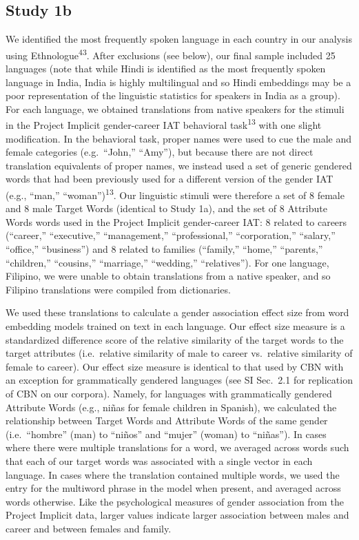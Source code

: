 \documentclass[9pt,twocolumn]{pnas-new}
\begin{document}
\subsection*{Study 1b}

We identified the most frequently spoken language in each country in our
analysis using Ethnologue\textsuperscript{43}. After exclusions
(see below), our final sample included 25
languages (note that while Hindi is identified as the most frequently spoken language in India, India is highly multilingual and so Hindi embeddings may be a poor representation of  the linguistic statistics for speakers in India as a group).
For each language, we obtained translations from native speakers for the
stimuli in the Project Implicit gender-career IAT behavioral task\textsuperscript{13} with one slight modification. In the behavioral task,
proper names were used to cue the male and female categories
(e.g.~\enquote{John,} \enquote{Amy}), but because there are not direct
translation equivalents of proper names, we instead used a set of
generic gendered words that had been previously used for a different
version of the gender IAT (e.g., ``man,'' ``woman'')\textsuperscript{13}. Our linguistic stimuli were therefore a set of 8 female and 8
male Target Words (identical to Study 1a), and the set of 8 Attribute
Words words used in the Project Implicit gender-career IAT: 8 related to
careers (\enquote{career,} \enquote{executive,} \enquote{management,}
\enquote{professional,} \enquote{corporation,} \enquote{salary,}
\enquote{office,} \enquote{business}) and 8 related to families
(\enquote{family,} \enquote{home,} \enquote{parents,}
\enquote{children,} \enquote{cousins,} \enquote{marriage,}
\enquote{wedding,} \enquote{relatives}). For one language, Filipino, we
were unable to obtain translations from a native speaker, and so
Filipino translations were compiled from dictionaries.

We used these translations to calculate a gender association effect size from
word embedding models trained on text in each language. Our effect size
measure is a standardized difference score of the relative similarity of
the target words to the target attributes (i.e.~relative similarity of
male to career vs.~relative similarity of female to career). Our effect
size measure is identical to that used by CBN with an exception for
grammatically gendered languages (see SI Sec.\ 2.1 for replication of CBN on our
corpora). Namely, for languages with grammatically gendered Attribute
Words (e.g., niñas for female children in Spanish), we calculated the
relationship between Target Words and Attribute Words of the same gender
(i.e.~\enquote{hombre} (man) to \enquote{niños} and \enquote{mujer}
(woman) to \enquote{niñas}). In cases where there were multiple
translations for a word, we averaged across words such that each of our
target words was associated with a single vector in each language. In
cases where the translation contained multiple words, we used the entry
for the multiword phrase in the model when present, and averaged across
words otherwise. Like the psychological measures of gender association from the
Project Implicit data, larger values indicate larger association between males and career and between females and family.
\end{document}
